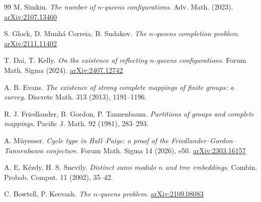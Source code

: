 \begin{thebibliography}{99}
 M. Simkin. \emph{The number of $n$-queens configurations}. Adv. Math. (2023). \href{https://arxiv.org/abs/2107.13460}{arXiv:2107.13460}

 S. Glock, D. Munh\'a Correia, B. Sudakov. \emph{The $n$-queens completion problem}. \href{https://arxiv.org/abs/2111.11402}{arXiv:2111.11402}

 T. Dai, T. Kelly. \emph{On the existence of reflecting $n$-queens configurations}. Forum Math. Sigma (2024). \href{https://arxiv.org/abs/2407.12742}{arXiv:2407.12742}

 A. B. Evans. \emph{The existence of strong complete mappings of finite groups: a survey}. Discrete Math. 313 (2013), 1191--1196.

 R. J. Friedlander, B. Gordon, P. Tannenbaum. \emph{Partitions of groups and complete mappings}. Pacific J. Math. 92 (1981), 283--293.

 A. M\"uyesser. \emph{Cycle type in Hall--Paige: a proof of the Friedlander--Gordon--Tannenbaum conjecture}. Forum Math. Sigma 14 (2026), e50. \href{https://arxiv.org/abs/2303.16157}{arXiv:2303.16157}

 A. E. K\'ezdy, H. S. Snevily. \emph{Distinct sums modulo $n$ and tree embeddings}. Combin. Probab. Comput. 11 (2002), 35--42.

 C. Bowtell, P. Keevash. \emph{The $n$-queens problem}. \href{https://arxiv.org/abs/2109.08083}{arXiv:2109.08083}

\end{thebibliography}

